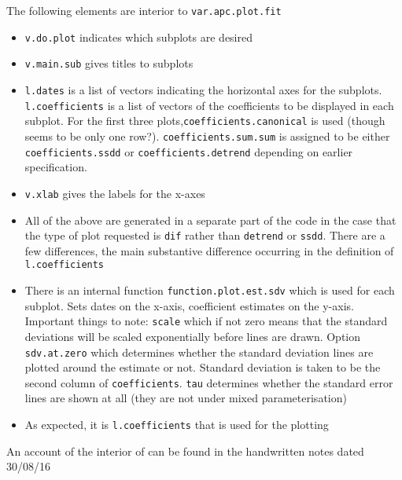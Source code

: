 \documentclass{article}
\begin{document}
The following elements are interior to \texttt{var.apc.plot.fit}
\begin{itemize}
\item \texttt{v.do.plot} indicates which subplots are desired
\item \texttt{v.main.sub} gives titles to subplots
\item \texttt{l.dates} is a list of vectors indicating the horizontal axes for the subplots. \texttt{l.coefficients} is a list of vectors of the coefficients to be displayed in each subplot. For the first three plots,\texttt{coefficients.canonical} is used (though seems to be only one row?). \texttt{coefficients.sum.sum} is assigned to be either \texttt{coefficients.ssdd} or \texttt{coefficients.detrend} depending on earlier specification.
\item \texttt{v.xlab} gives the labels for the x-axes
\item All of the above are generated in a separate part of the code in the case that the type of plot requested is \texttt{dif} rather than \texttt{detrend} or \texttt{ssdd}. There are a few differences, the main substantive difference occurring in the definition of \texttt{l.coefficients}
\item There is an internal function \texttt{function.plot.est.sdv} which is used for each subplot. Sets dates on the x-axis, coefficient estimates on the y-axis. Important things to note: \texttt{scale} which if not zero means that the standard deviations will be scaled exponentially before lines are drawn. Option \texttt{sdv.at.zero} which determines whether the standard deviation lines are plotted around the estimate or not. Standard deviation is taken to be the second column of \texttt{coefficients}. \texttt{tau} determines whether the standard error lines are shown at all (they are not under mixed parameterisation)
\item As expected, it is \texttt{l.coefficients} that is used for the plotting
\end{itemize}

An account of the interior of  can be found in the handwritten notes dated 30/08/16
\end{document}
